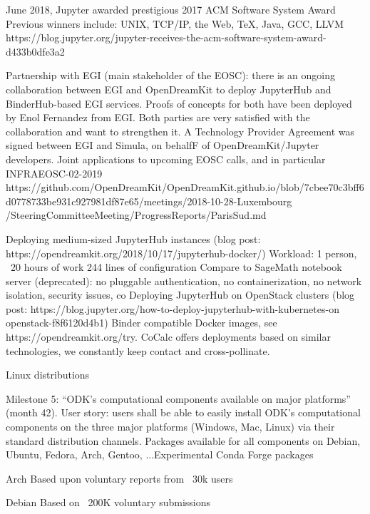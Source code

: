 \begin{Aim 1}
\begin{Aim 2}
\begin{itemize}
       June 2018, Jupyter awarded prestigious 2017 ACM Software System Award
       Previous winners include: UNIX, TCP/IP, the Web, TeX, Java, GCC, LLVM
       https://blog.jupyter.org/jupyter-receives-the-acm-software-system-award-d433b0dfe3a2
       
       
       Partnership with EGI (main stakeholder of the EOSC): there is an ongoing collaboration between EGI and OpenDreamKit to deploy
       JupyterHub and BinderHub-based EGI services. Proofs of concepts for both have been deployed by Enol Fernandez from EGI. Both parties
       are very satisfied with the collaboration and want to strengthen it. A Technology Provider Agreement was signed between EGI and
       Simula, on behalfF of OpenDreamKit/Jupyter developers. Joint applications to upcoming EOSC calls, and in particular INFRAEOSC-02-2019
       https://github.com/OpenDreamKit/OpenDreamKit.github.io/blob/7cbee70c3bff6d0778733be931c927981df87e65/meetings/2018-10-28-Luxembourg
       /SteeringCommitteeMeeting/ProgressReports/ParisSud.md
       
       

    Deploying medium-sized JupyterHub instances (blog post: https://opendreamkit.org/2018/10/17/jupyterhub-docker/)
        Workload: 1 person, ~20 hours of work
        244 lines of configuration
        Compare to SageMath notebook server (deprecated): no pluggable authentication, no containerization, no network isolation, security
        issues, co
        Deploying JupyterHub on OpenStack clusters (blog post: https://blog.jupyter.org/how-to-deploy-jupyterhub-with-kubernetes-on
        openstack-f8f6120d4b1)
        Binder compatible Docker images, see https://opendreamkit.org/try.
        CoCalc offers deployments based on similar technologies, we constantly keep contact and cross-pollinate.

      Linux distributions
     
     Milestone 5: “ODK’s computational components available on major platforms” (month 42).
      User story: users shall be able to easily install ODK’s computational components on the three major platforms (Windows, Mac, Linux)
      via their standard distribution channels.
      Packages available for all components on Debian, Ubuntu, Fedora, Arch, Gentoo, ...Experimental Conda Forge packages
      
      Arch Based upon voluntary reports from ~30k users
      
      Debian Based on ~200K voluntary submissions
      

\end{itemize}
\end{Aim 2}
\end{Aim 1}
